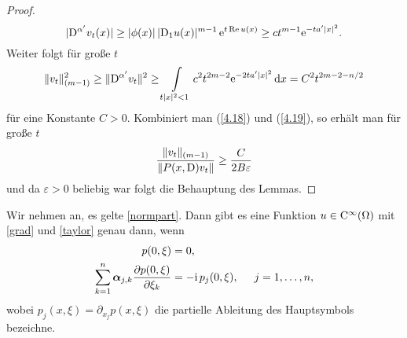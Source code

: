 \begin{proof}
\begin{equation}
 |\mathrm D^{\alpha'} v_t(x)| \ge |\phi(x)|\, |\mathrm D_1 u(x)|^{m-1} \,\mathrm e^{t \operatorname{Re} u(x)} \ge ct^{m-1}\mathrm e^{-ta'|x|^2}.
\end{equation}
Weiter folgt für große $t$    
\begin{equation}
	\label{4.19}
\lVert v_t \rVert_{(m-1)}^2 \ge \lVert \mathrm D^{\alpha'} v_t\rVert^2 \ge \int\limits_{t|x|^2 < 1}c^2t^{2m-2}\mathrm e^{-2ta'|x|^2} \,\mathrm d x = C^2 t^{2m-2-n/2}
\end{equation}
für eine Konstante $C > 0$. Kombiniert man (\ref{4.18}) und (\ref{4.19}), so erhält man für große $t$
\begin{equation}
\dfrac{\lVert v_t \rVert_{(m-1)}}{\lVert P(x,\mathrm D) v_t \rVert} \ge \dfrac{C}{2B\varepsilon}
\end{equation}
und da $\varepsilon>0$ beliebig war folgt die Behauptung des Lemmas.
\end{proof}

\begin{lem}\label{thm:4:lem2}
Wir nehmen an, es gelte \eqref{normpart}. Dann gibt es eine Funktion $u \in \mathrm C^\infty(\Omega)$ mit \eqref{grad} und \eqref{taylor} genau dann, wenn
\begin{align}
	\label{4.15}
p(0, \xi) &= 0, \\ 	\label{4.16}
\sum_{k=1}^{n} \boldsymbol\alpha_{j,k}\frac{\partial p(0,\xi)}{\partial \xi_k} &= -\mathrm i\,  p_j(0,\xi), \hspace{0.5cm} j=1, \ldots, n, 
\end{align}
wobei $ p_j(x,\xi) = \partial_{x_j}  p(x,\xi)$ die partielle Ableitung des Hauptsymbols bezeichne.
\end{lem}

